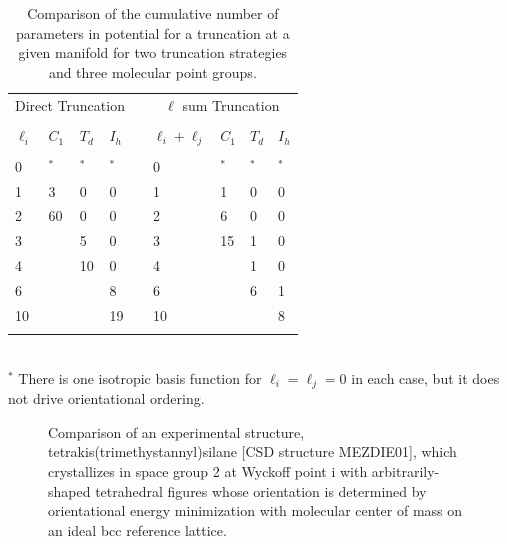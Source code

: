 \documentclass[preprint]{iucr}              %
\begin{document}
\pagebreak

\begin{table}%
\caption{Comparison of the cumulative number of parameters in
potential for a truncation at a given manifold for two truncation
strategies and three molecular point groups.}\label{tab:truncation}
\begin{tabular}{lllllllll}
\multicolumn{4}{c}{Direct Truncation} & &\multicolumn{4}{c}{$\ell$ sum Truncation}\\
\cline{1-4}\cline{6-9}\\
$\ell_i$ & $C_1$ & $T_d$ & $I_h$ & & $\ell_i+\ell_j$ & $C_1$ &
$T_d$ & $I_h$\\
\cline{1-4}\cline{6-9}\\
0  & $^*$  & $^*$  & $^*$  & & 0  & $^*$  & $^*$ & $^*$ \\
1  & 3  & 0  & 0  & & 1  & 1  & 0 & 0 \\
2  & 60 & 0  & 0  & & 2  & 6  & 0 & 0 \\
3  &    & 5  & 0  & & 3  & 15 & 1 & 0 \\
4  &    & 10 & 0  & & 4  &    & 1 & 0 \\
6  &    &    & 8  & & 6  &    & 6 & 1 \\
10 &    &    & 19 & & 10 &    &   & 8 \\
\cline{1-4}\cline{6-9}\\
\end{tabular}
\\$^*$ There is one isotropic basis function for $\ell_i=\ell_j=0$ in
each case, but it does not drive orientational ordering.
\end{table}
\pagebreak



\begin{figure}%
\caption{Comparison of an experimental structure,
tetrakis(trimethystannyl)silane  [CSD structure MEZDIE01], which
crystallizes in space group 2 at Wyckoff point i with
arbitrarily-shaped tetrahedral figures whose orientation is
determined by orientational energy minimization with molecular
center of mass on an ideal bcc reference lattice.\label{compare}}
\end{figure}
\end{document}
